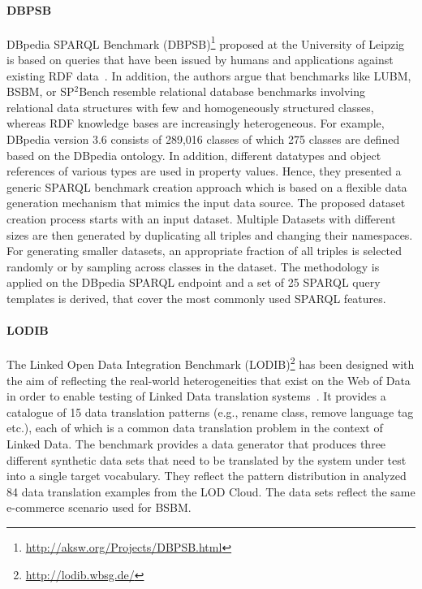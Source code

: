 \paragraph{DBPSB} DBpedia SPARQL Benchmark (DBPSB)\footnote{\url{http://aksw.org/Projects/DBPSB.html}} proposed at the University of Leipzig is based on queries that have been issued by humans and applications
against existing RDF data~\cite{Morsey2011,Morsey:2012:UBR:2900929.2901031}. In addition, the authors argue that benchmarks like LUBM, BSBM, or SP$^2$Bench resemble relational database benchmarks involving relational data structures with few and homogeneously structured classes, whereas RDF knowledge bases are increasingly heterogeneous. For example, DBpedia version 3.6 consists of 289,016 classes of which 275 classes are defined based on the DBpedia ontology. In addition, different datatypes and object references of various types are
used in property values. Hence, they presented a generic SPARQL benchmark creation approach which is based on a flexible data generation mechanism that mimics the input data source. The proposed dataset creation process starts with an input dataset. Multiple Datasets with different sizes  are then generated by duplicating all triples and changing their namespaces.  For generating smaller datasets, an appropriate fraction of all triples is selected randomly or by sampling across classes in the dataset. \iffalse The goal of the query analysis and clustering is to detect prototypical queries on the basis of their frequent usage and similarity.\fi The methodology is applied on the DBpedia SPARQL endpoint and a set of 25 SPARQL query templates is derived, that cover the most commonly used SPARQL features.

\paragraph{LODIB} The Linked Open Data Integration Benchmark (LODIB)\footnote{\url{http://lodib.wbsg.de/}} has been designed with the aim of reflecting the real-world heterogeneities that exist on the Web of Data in order to enable testing of Linked Data translation systems~\cite{DBLP:conf/www/RiveroSBR12}. It provides a catalogue of 15 data translation patterns (e.g., rename class, remove language tag etc.), each of which is a common data translation problem in the context of Linked Data. The benchmark provides a data generator that produces three different synthetic data sets that need to be translated
by the system under test into a single target vocabulary. They  reflect the pattern distribution in analyzed 84 data translation examples from the LOD Cloud. The data sets reflect the same e-commerce scenario used for BSBM.


